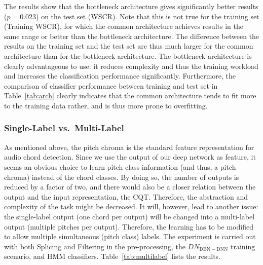 \documentclass{article}
\begin{document}
The results show that the bottleneck architecture gives significantly better results ($p=0.023$) on the test set (WSCR). Note that this is not true for the training set (Training WSCR), for which the common architecture achieves results in the same range or better than the bottleneck architecture. The difference between the results on the training set and the test set are thus much larger for the common architecture than for the bottleneck architecture.
The bottleneck architecture is clearly advantageous to use: it reduces complexity and thus the training workload and increases the classification performance significantly. Furthermore, the comparison of classifier performance between training and test set in Table~\ref{tab:arch} clearly indicates that the common architecture tends to fit more to the training data rather, and is thus more prone to overfitting. 


\subsubsection{Single-Label vs.\ Multi-Label}
As mentioned above, the pitch chroma is the standard feature representation for audio chord detection. Since we use the output of our deep network as feature, it seems an obvious choice to learn pitch class information (and thus, a pitch chroma) instead of the chord classes. By doing so, the number of outputs is reduced by a factor of two, and there would also be a closer relation between the output and the input representation, the CQT. Therefore, the abstraction and complexity of the task might be decreased. It will, however, lead to another issue: the single-label output (one chord per output) will be changed into a multi-label output (multiple pitches per output). Therefore, the learning has to be modified to allow multiple simultaneous (pitch class) labels. 
The experiment is carried out with both Splicing and Filtering in the pre-processing, the $DN_\mathrm{DBN-DNN}$ training scenario, and HMM classifiers. Table~\ref{tab:multilabel} lists the results. 
\end{document}
